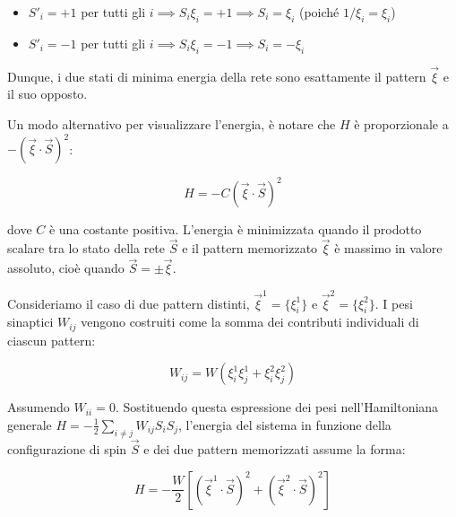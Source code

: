 \begin{itemize}
    \item $S'_i = +1$ per tutti gli $i \implies S_i \xi_i = +1 \implies S_i = \xi_i$ (poiché $1/\xi_i = \xi_i$)
    \item $S'_i = -1$ per tutti gli $i \implies S_i \xi_i = -1 \implies S_i = -\xi_i$
\end{itemize}

Dunque, i due stati di minima energia della rete sono esattamente il pattern $\vec{\xi}$ e il suo opposto.

\vspace{0.5cm}
\noindent{}
\vspace{0.5cm}

Un modo alternativo per visualizzare l'energia, è notare che $H$ è proporzionale a $-(\vec{\xi} \cdot \vec{S})^2$:

\begin{equation} \label{eq:ch21_20}
H = -C (\vec{\xi} \cdot \vec{S})^2
\end{equation}

dove $C$ è una costante positiva. L'energia è minimizzata quando il prodotto scalare tra lo stato della rete $\vec{S}$ e il pattern memorizzato $\vec{\xi}$ è massimo in valore assoluto, cioè quando $\vec{S} = \pm\vec{\xi}$.

Consideriamo il caso di due pattern distinti, $\vec{\xi}^1 = \{\xi_i^1\}$ e $\vec{\xi}^2 = \{\xi_i^2\}$.
I pesi sinaptici $W_{ij}$ vengono costruiti come la somma dei contributi individuali di ciascun pattern:

\begin{equation} \label{eq:ch21_21}
W_{ij} = W(\xi_i^1 \xi_j^1 + \xi_i^2 \xi_j^2)
\end{equation}

Assumendo $W_{ii}=0$. Sostituendo questa espressione dei pesi nell'Hamiltoniana generale $H = -\frac{1}{2}\sum_{i \neq j} W_{ij}S_iS_j$, l'energia del sistema in funzione della configurazione di spin $\vec{S}$ e dei due pattern memorizzati assume la forma:

\begin{equation} \label{eq:ch21_22}
H = -\frac{W}{2}\left[ (\vec{\xi}^1 \cdot \vec{S})^2 + (\vec{\xi}^2 \cdot \vec{S})^2 \right]
\end{equation}

